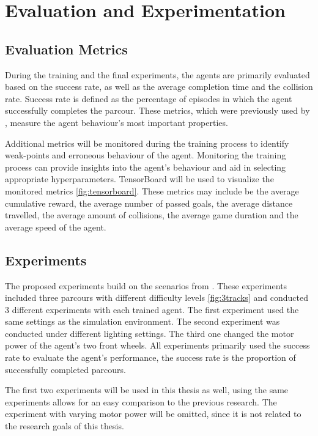 \chapter{Evaluation and Experimentation}

\section{Evaluation Metrics}

During the training and the final experiments, the agents are primarily evaluated based on the success rate, as well as the average completion time and the collision rate. Success rate is defined as the percentage of episodes in which the agent successfully completes the parcour. These metrics, which were previously used by \autocite{maximilian}, measure the agent behaviour's most important properties.

Additional metrics will be monitored during the training process to identify weak-points and erroneous behaviour of the agent. Monitoring the training process can provide insights into the agent's behaviour and aid in selecting appropriate hyperparameters. TensorBoard will be used to visualize the monitored metrics \ref{fig:tensorboard}.
These metrics may include be the average cumulative reward, the average number of passed goals, the average distance travelled, the average amount of collisions, the average game duration and the average speed of the agent.


\section{Experiments}

The proposed experiments build on the scenarios from \autocite{maximilian}. These experiments included three parcours with different difficulty levels \ref{fig:3tracks} and conducted 3 different experiments with each trained agent. The first experiment used the same settings as the simulation environment. The second experiment was conducted under different lighting settings. The third one changed the motor power of the agent's two front wheels. All experiments primarily used the success rate to evaluate the agent's performance, the success rate is the proportion of successfully completed parcours.

The first two experiments will be used in this thesis as well, using the same experiments allows for an easy comparison to the previous research. The experiment with varying motor power will be omitted, since it is not related to the research goals of this thesis.


